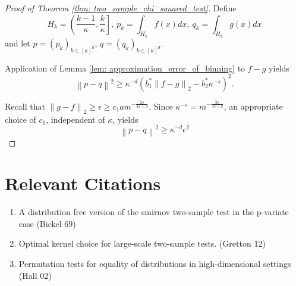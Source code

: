 \documentclass{article}
\newcommand{\norm}[1]{\left\lVert#1\right\rVert}
\newcommand{\1}{\mathbb{I}}
\theoremstyle{alden}
\theoremstyle{aldenthm}
\theoremstyle{definition}
\theoremstyle{remark}
\begin{document}
\begin{proof}[Proof of Theorem \ref{thm: two_sample_chi_squared_test}]
	
Define
\begin{equation*}
H_k = \left(\frac{k-1}{\kappa}, \frac{k}{\kappa}\right],~ p_k = \int_{H_k} f(x) dx,~ q_k = \int_{H_k} g(x) dx
\end{equation*}
and let $p = (p_k)_{k \in [\kappa]^d}$, $q = (q_k)_{k \in [\kappa]^d}$. 
	
Application of Lemma \ref{lem: approximation_error_of_binning} to $f - g$ yields
\begin{equation*}
\norm{p - q}^2 \geq \kappa^{-d} \left( b_1^* \norm{f - g}_2 - b_2^* \kappa^{-s} \right)^2.
\end{equation*}

Recall that $\norm{g - f}_2 \geq \epsilon \geq c_1 a m^{-\frac{2s}{4s + d}}$. Since $\kappa^{-s} = m^{-\frac{2s}{4s + d}}$, an appropriate choice of $c_1$, independent of $\kappa$, yields
\begin{equation*}
\norm{p - q}^2 \geq \kappa^{-d} \epsilon^2
\end{equation*}

\end{proof}

\section{Relevant Citations}

\begin{enumerate}
	\item A distribution free version of the smirnov two-sample test in the p-variate case (Bickel 69)
	\item Optimal kernel choice for large-scale two-sample tests. (Gretton 12)
	\item Permutation tests for equality of distributions in high-dimensional settings (Hall 02)
\end{enumerate}
\end{document}
